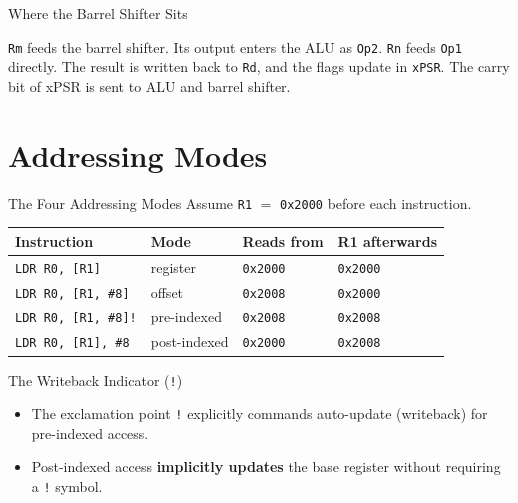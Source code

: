 \documentclass[9pt,aspectratio=169,xcolor=table]{beamer}
\begin{document}
\begin{frame}[plain]{Where the Barrel Shifter Sits}
\begin{center}
{\begin{tikzpicture}[xscale=0.11,yscale=-0.11]
			\end{tikzpicture}%
		}
	\end{center}
	\vspace{1mm}
	{\small\centering \texttt{Rm} feeds the barrel shifter. Its output
		enters the ALU as \texttt{Op2}. \texttt{Rn} feeds \texttt{Op1}
		directly. The result is written back to \texttt{Rd}, and the flags
		update in \texttt{xPSR}. The carry bit of xPSR is sent to ALU and barrel shifter.\par}
\end{frame}


\section{Addressing Modes}

\begin{frame}{The Four Addressing Modes}
    \leavevmode
    Assume \texttt{R1} $=$ \texttt{0x2000} before each instruction.

    \vspace{3mm}
    \begin{center}
    {\small
    \striped
    \begin{tabular}{@{}l l l l@{}}
        \toprule
        \textbf{Instruction} & \textbf{Mode} & \textbf{Reads from} & \textbf{R1 afterwards} \\
        \midrule
        \texttt{LDR R0, [R1]}       & register     & \texttt{0x2000} & \texttt{0x2000} \\
        \texttt{LDR R0, [R1, \#8]}  & offset       & \texttt{0x2008} & \texttt{0x2000} \\
        \texttt{LDR R0, [R1, \#8]!} & pre-indexed  & \texttt{0x2008} & \alert{\texttt{0x2008}} \\
        \texttt{LDR R0, [R1], \#8}  & post-indexed & {\texttt{0x2000}} & \alert{\texttt{0x2008}} \\
        \bottomrule
    \end{tabular}}
    \end{center}

    \vspace{3mm}
  \begin{block}{The Writeback Indicator (\texttt{!})}
	\begin{itemize}
		\item The exclamation point \texttt{!} explicitly commands auto-update (writeback) for pre-indexed access.
		\item Post-indexed access \textbf{implicitly updates} the base register without requiring a \texttt{!} symbol.
	\end{itemize}
\end{block}
\end{frame}
\end{document}
